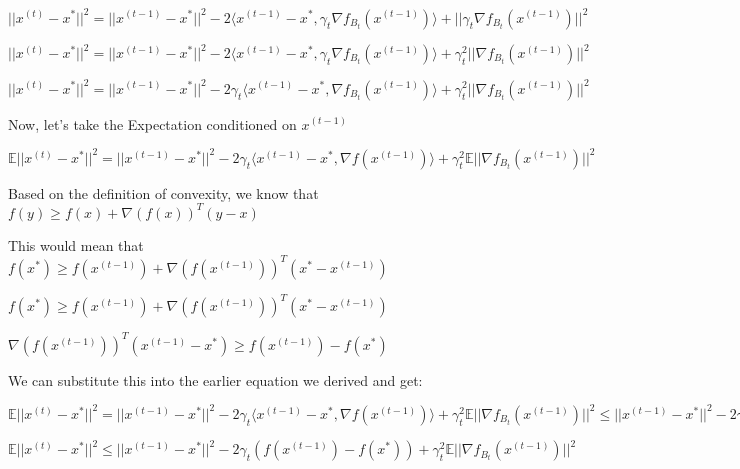 $||x^{(t)} - x^*||^2 = ||x^{(t - 1)} - x^*||^2 - 2\langle x^{(t - 1)} - x^*,  \gamma_t \nabla f_{B_t}(x^{(t - 1)})\rangle + ||\gamma_t \nabla f_{B_t}(x^{(t - 1)})||^2$ \newline 

$||x^{(t)} - x^*||^2 = ||x^{(t - 1)} - x^*||^2 - 2\langle x^{(t - 1)} - x^*,  \gamma_t \nabla f_{B_t}(x^{(t - 1)})\rangle + \gamma_t^2 ||\nabla f_{B_t}(x^{(t - 1)})||^2$ \newline 

$||x^{(t)} - x^*||^2 = ||x^{(t - 1)} - x^*||^2 - 2\gamma_t \langle x^{(t - 1)} - x^*,  \nabla f_{B_t}(x^{(t - 1)})\rangle + \gamma_t^2 ||\nabla f_{B_t}(x^{(t - 1)})||^2$ \newline 

Now, let's take the Expectation conditioned on $x^{(t - 1)}$ \newline 

$\mathbb{E}||x^{(t)} - x^*||^2 = ||x^{(t - 1)} - x^*||^2 - 2\gamma_t \langle x^{(t - 1)} - x^*,  \nabla f(x^{(t - 1)})\rangle + \gamma_t^2 \mathbb{E}||\nabla f_{B_t}(x^{(t - 1)})||^2$ \newline 

Based on the definition of convexity, we know that $f(y) \geq f(x) + \nabla(f(x))^T (y - x)$ \newline 

This would mean that $f(x^*) \geq f(x^{(t - 1)}) + \nabla(f(x^{(t - 1)}))^T (x^* - x^{(t - 1)})$ \newline 


$f(x^*) \geq f(x^{(t - 1)}) + \nabla(f(x^{(t - 1)}))^T (x^* - x^{(t - 1)})$ \newline 


$\nabla(f(x^{(t - 1)}))^T (x^{(t - 1)} - x^*) \geq f(x^{(t - 1)}) - f(x^*)$ \newline 

We can substitute this into the earlier equation we derived and get: \newline 

$\mathbb{E}||x^{(t)} - x^*||^2 = ||x^{(t - 1)} - x^*||^2 - 2\gamma_t \langle x^{(t - 1)} - x^*,  \nabla f(x^{(t - 1)})\rangle + \gamma_t^2 \mathbb{E}||\nabla f_{B_t}(x^{(t - 1)})||^2 \leq ||x^{(t - 1)} - x^*||^2 - 2\gamma_t (f(x^{(t - 1)}) - f(x^*)) + \gamma_t^2 \mathbb{E}||\nabla f_{B_t}(x^{(t - 1)})||^2$ \newline 

$\mathbb{E}||x^{(t)} - x^*||^2 \leq ||x^{(t - 1)} - x^*||^2 - 2\gamma_t (f(x^{(t - 1)}) - f(x^*)) + \gamma_t^2 \mathbb{E}||\nabla f_{B_t}(x^{(t - 1)})||^2$ \newline 


